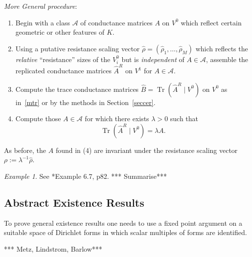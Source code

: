 \documentclass[a4paper]{amsart}
\theoremstyle{plain}
\theoremstyle{definition}
\theoremstyle{remark}
\newtheorem{example}[theorem]{Example}
\DeclareMathOperator{\Tr}{Tr}
\begin{document}
\bigskip \noindent  \emph{More General procedure}: 
\begin{enumerate}
\item Begin with a class $ \mathcal{A} $ of conductance matrices  $ A $ on $ V^{0} $ which reflect  certain geometric or other features of $ K $.  

\item Using  a putative resistance scaling vector $\widehat{\rho} = (\widehat{\rho}_1 ,\dots, \widehat{\rho}_M) $ which reflects the \emph{relative} ``resistance'' sizes of the $ V_i^{0} $ but is \emph{independent} of $ A \in \mathcal{A} $,   assemble  the replicated conductance matrices $ \widehat{A}^R $ on $ V^{1} $ for $ A \in \mathcal{A} $.  

\item Compute the trace conductance matrices $ \widehat{B} = \Tr (\widehat{A}^R\mid V^{0}) $ on $ V^{0} $   as in~\eqref{mtr} or by the methods in Section~\ref{seccer}.

\item  Compute  those  $A \in \mathcal{A} $ for which there exists $\lambda > 0 $ such that 
\begin{equation} \label{}
      \Tr (\widehat{A}^R\mid V^{0})  =  \lambda A.
\end{equation} 
\end{enumerate} 


As before, the $ A $ found in (4) are invariant under the resistance scaling vector $ \rho := \lambda ^{-1} \widehat{\rho} $.

\begin{example}
See \cite{Bar1}*{Example 6.7, p82}.   *** Summarise***
\end{example} 

\subsection{Abstract Existence Results} 
 To prove general existence results one needs to use a fixed point argument on a suitable space of Dirichlet forms in which scalar multiples of forms are identified.
 
 
 *** Metz, Lindstrom, Barlow***







\end{document}
